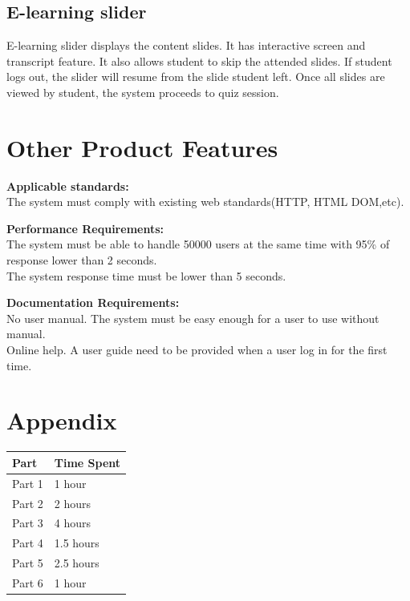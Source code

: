 \documentclass[a4paper]{article}
\begin{document}
\subsection{E-learning slider}
E-learning slider displays the content slides. It has interactive screen and transcript feature. It also allows student to skip the attended slides. If student logs out, the slider will resume from the slide student left. Once all slides are viewed by student, the system proceeds to quiz session. 
\bigskip


\section{Other Product Features}
\textbf{Applicable standards:}\\
The system must comply with existing web standards(HTTP, HTML DOM,etc).

\medskip
\textbf{Performance Requirements:}\\
The system must be able to handle 50000 users at the same time with 95\% of response lower than 2 seconds. \\
The system response time must be lower than 5 seconds.

\medskip
\textbf{Documentation Requirements: }\\
No user manual. The system must be easy enough for a user to use without manual.\\
Online help. A user guide need to be provided when a user log in for the first time.\\

\section{Appendix}
\begin{table}[H]
\centering
\begin{tabular}{|p{5cm}|p{5cm}|}
\hline
\rowcolor{gray}
Part & Time Spent\\ \hline
Part 1 & 1 hour\\ \hline
Part 2 & 2 hours\\ \hline
Part 3 & 4 hours\\ \hline
Part 4 & 1.5 hours \\ \hline
Part 5 & 2.5 hours\\ \hline
Part 6 & 1 hour\\ 
\hline
\end{tabular}
\end{table}
\end{document}
